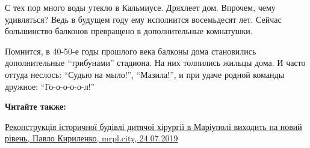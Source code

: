 С тех пор много воды утекло в Кальмиусе. Дряхлеет дом. Впрочем, чему
удивляться? Ведь в будущем году ему исполнится восемьдесят лет. Сейчас
большинство балконов превращено в дополнительные комнатушки.

Помнится, в 40-50-е годы прошлого века балконы дома становились дополнительные
\enquote{трибунами} стадиона. На них толпились жильцы дома. И часто оттуда неслось:
\enquote{Судью на мыло!}, \enquote{Мазила!}, и при удаче родной команды дружное:
\enquote{Го-о-о-о-о-л!}

\textbf{Читайте также:} 

\href{https://mrpl.city/blogs/view/rekonstruktsiya-istorichnoi-budivli-dityachoi-hirurgii-v-mariupoli-vihodit-na-novij-riven}{%
Реконструкція історичної будівлі дитячої хірургії в Маріуполі виходить на новий рівень, Павло Кириленко, mrpl.city, 24.07.2019}

\clearpage
